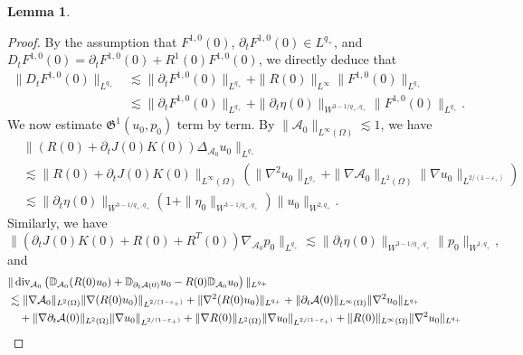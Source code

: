 \documentclass[letterpaper,reqno,10pt,twoside]{amsart}
\newtheorem{lemma}[theorem]{Lemma}
\theoremstyle{definition}
\theoremstyle{remark}
\def\p{\partial}
\def\Om{\Omega}
\def\dive{\mathop{\rm div}\nolimits}
\begin{document}
\begin{appendix}
\begin{lemma}
			\end{lemma}
			\begin{proof}
				By the assumption that $F^{1,0}(0)$, $\p_tF^{1,0}(0)\in L^{q_+}$, and $D_tF^{1,0}(0)=\p_tF^{1,0}(0)+R^1(0)F^{1,0}(0)$, we directly deduce that
				\begin{equation}\label{est:initial_dtf1}
					\begin{aligned}
						\|D_tF^{1,0}(0)\|_{L^{q_+}}&\lesssim \|\p_tF^{1,0}(0)\|_{L^{q_+}}+\|R(0)\|_{L^\infty}\|F^{1,0}(0)\|_{L^{q_+}}\\
						&\lesssim\|\p_tF^{1,0}(0)\|_{L^{q_+}}+\|\p_t\eta(0)\|_{W^{3-1/q_+,q_+}}\|F^{1,0}(0)\|_{L^{q_+}}.
					\end{aligned}
				\end{equation}
				We now estimate $\mathfrak{G}^1(u_0, p_0)$ term by term. By $\|\mathcal{A}_0\|_{L^\infty(\Om)}\lesssim1$, we have
				\begin{equation}\label{est:initial_g11}
					\begin{aligned}
						&\|(R(0)+\p_tJ(0)K(0))\Delta_{\mathcal{A}_0}u_0\|_{L^{q_+}}\\
						&\lesssim\|R(0)+\p_tJ(0)K(0)\|_{L^\infty(\Om)}(\|\nabla^2u_0\|_{L^{q_+}}+\|\nabla\mathcal{A}_0\|_{L^2(\Om)}\|\nabla u_0\|_{L^{2/(1-\varepsilon_+)}})\\
						&\lesssim \|\p_t\eta(0)\|_{W^{3-1/q_+,q_+}}(1+\|\eta_0\|_{W^{3-1/q_+,q_+}})\|u_0\|_{W^{2,q_+}}.
					\end{aligned}
				\end{equation}
				Similarly, we have
				\begin{equation}\label{est:initial_g12}
					\|(\p_tJ(0)K(0)+R(0)+R^T(0))\nabla_{\mathcal{A}_0}p_0\|_{L^{q_+}}\lesssim \|\p_t\eta(0)\|_{W^{3-1/q_+,q_+}}\|p_0\|_{W^{1,q_+}},
				\end{equation}
				and
				\begin{equation}\label{est:initial_g13}
					\begin{aligned}
						&\|\dive_{\mathcal{A}_0}\left(\mathbb{D}_{\mathcal{A}_0}(R(0)u_0)+\mathbb{D}_{\p_t\mathcal{A}(0)}u_0-R(0)\mathbb{D}_{\mathcal{A}_0}u_0\right)\|_{L^{q_+}}\\
						&\lesssim \|\nabla\mathcal{A}_0\|_{L^2(\Om)}\|\nabla(R(0) u_0)\|_{L^{2/(1-\varepsilon_+)}}+\|\nabla^2(R(0) u_0)\|_{L^{q_+}}+\|\p_t\mathcal{A}(0)\|_{L^\infty(\Om)}\|\nabla^2u_0\|_{L^{q_+}}\\
						&\quad+\|\nabla\p_t\mathcal{A}(0)\|_{L^2(\Om)}\|\nabla u_0\|_{L^{2/(1-\varepsilon_+)}}+\|\nabla R(0)\|_{L^2(\Om)}\|\nabla u_0\|_{L^{2/(1-\varepsilon_+)}}+\|R(0)\|_{L^\infty(\Om)}\|\nabla^2 u_0\|_{L^{q_+}}\\

\end{aligned}
\end{equation}
\end{proof}
\end{appendix}
\end{document}
